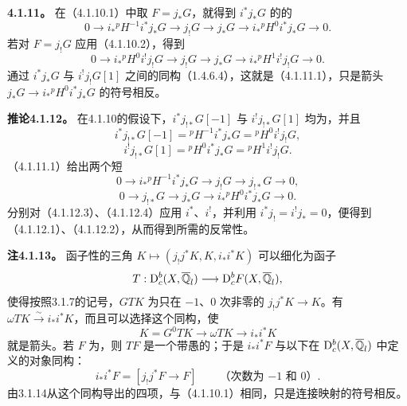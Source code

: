 \par\medskip\noindent\textbf{4.1.11。} 在（4.1.10.1）中取 $F=j_*G$，就得到 $i^*j_*G$ 的的
\begin{equation*}0\longrightarrow i_*{}^pH^{-1}i^*j_*G\longrightarrow j_!G\longrightarrow j_*G\longrightarrow i_*{}^pH^0i^*j_*G\longrightarrow0.\tag{4.1.11.1}\end{equation*}
若对 $F=j_!G$ 应用（4.1.10.2），得到
\[0\longrightarrow i_*{}^pH^0i^!j_!G\longrightarrow j_!G\longrightarrow j_*G\longrightarrow i_*{}^pH^1i^!j_!G\longrightarrow0.\]
通过 $i^*j_*G$ 与 $i^!j_!G[1]$ 之间的同构（1.4.6.4），这就是（4.1.11.1），只是箭头 $j_*G\to i_*{}^pH^0i^*j_*G$ 的符号相反。

\par\medskip\noindent\textbf{推论4.1.12。} 在4.1.10的假设下，$i^*j_{!*}G[-1]$ 与 $i^!j_{!*}G[1]$ 均为，并且
\begin{equation*}i^*j_{!*}G[-1]={}^pH^{-1}i^*j_*G={}^pH^0i^!j_!G,\tag{4.1.12.1}\end{equation*}
\begin{equation*}i^!j_{!*}G[1]={}^pH^0i^*j_*G={}^pH^1i^!j_!G.\tag{4.1.12.2}\end{equation*}
（4.1.11.1）给出两个短
\begin{equation*}0\longrightarrow i_*{}^pH^{-1}i^*j_*G\longrightarrow j_!G\longrightarrow j_{!*}G\longrightarrow0,\tag{4.1.12.3}\end{equation*}
\begin{equation*}0\longrightarrow j_{!*}G\longrightarrow j_*G\longrightarrow i_*{}^pH^0i^*j_*G\longrightarrow0.\tag{4.1.12.4}\end{equation*}
分别对（4.1.12.3）、（4.1.12.4）应用 $i^*$、$i^!$，并利用 $i^*j_!=i^!j_*=0$，便得到（4.1.12.1）、（4.1.12.2），从而得到所需的反常性。

\par\medskip\noindent\textbf{注4.1.13。} 函子性的三角 $K\mapsto(j_!j^*K,K,i_*i^*K)$ 可以细化为函子
\[T:\mathrm{D}_c^b(X,\overline{\mathbb Q}_l)\longrightarrow\mathrm{D}_c^bF(X,\overline{\mathbb Q}_l),\]
使得按照3.1.7的记号，$GTK$ 为只在 $-1$、$0$ 次非零的 $j_!j^*K\to K$。有 $\omega TK\xrightarrow\sim i_*i^*K$，而且可以选择这个同构，使
\[K=G^0TK\longrightarrow\omega TK\longrightarrow i_*i^*K\]
就是箭头。若 $F$ 为，则 $TF$ 是一个带愚的；于是 $i_*i^*F$ 与以下在 $\mathrm{D}_c^b(X,\overline{\mathbb Q}_l)$ 中定义的对象同构：
\[i_*i^*F=[j_!j^*F\longrightarrow F]\qquad\text{（次数为 $-1$ 和 $0$）}.\]
由3.1.14从这个同构导出的四项，与（4.1.10.1）相同，只是连接映射的符号相反。

